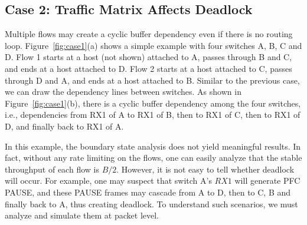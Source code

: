 \subsection{Case 2: Traffic Matrix Affects Deadlock}
\secspace

Multiple flows may create a cyclic buffer dependency even if there is no routing loop.
Figure~\ref{fig:case1}(a) shows a simple example with four switches A, B, C and D. 
Flow 1 starts at a host (not shown) attached to A, passes through B and C, and ends at a 
host attached to D. Flow 2 starts at a host attached to C, passes through D and A, and 
ends at a host attached to B.
Similar to the previous case, we can draw the dependency lines between switches. As shown in 
Figure~\ref{fig:case1}(b), there is a cyclic buffer dependency among the four switches, i.e., 
dependencies from RX1 of A to RX1 of B, then to RX1 of C, then to RX1 of D, and finally back to RX1 of A.


In this example, the boundary state analysis does not yield meaningful
results. In fact, without any rate limiting on the flows, one can easily analyze that the 
stable throughput of each flow is $B/2$. However, it is not easy to tell whether deadlock 
will occur. For example, one may suspect that switch A's $RX1$ will generate PFC PAUSE, and 
these PAUSE frames may cascade from A to D, then to C, B and finally back to A, thus creating deadlock.
To understand such scenarios, we must analyze and simulate them at packet level.


